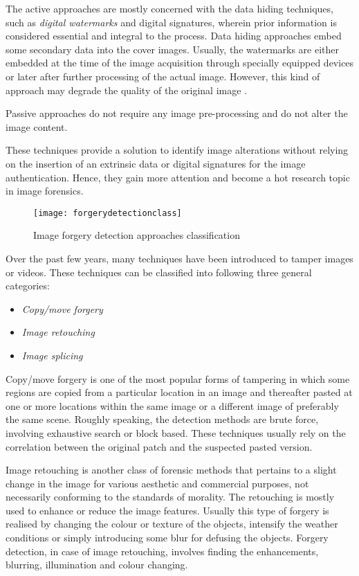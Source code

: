 The active approaches are mostly concerned with the data hiding techniques, such as \emph{digital watermarks} \cite{rey2002survey}\cite{ye2005watermarking} and digital signatures, wherein prior information is considered essential and integral to the process. Data hiding approaches embed some secondary data into the cover images. Usually, the watermarks are either embedded at the time of the image acquisition through specially equipped devices or later after further processing of the actual image.
However, this kind of approach may degrade the quality of the original image \cite{van2007survey}.

Passive approaches \cite{ng2006passive} do not require any image pre-processing and do not alter the image content. 

These techniques provide a solution to identify image alterations without relying on the insertion of an
extrinsic data or digital signatures for the image authentication. Hence, they gain more attention and become a hot research topic in image forensics.


\begin{figure}
  \centering
    \texttt{[image: forgerydetectionclass]}
    \caption{Image forgery detection approaches classification}
\end{figure}

Over the past few years, many techniques have been introduced to tamper images or
videos. These techniques can be classified into following three general categories:

\begin{itemize}
\item \emph{Copy/move forgery}
\item \emph{Image retouching}
\item \emph{Image splicing}
\end{itemize}

Copy/move forgery is one of the most popular forms of tampering in which some regions are copied from a particular location in an image and thereafter pasted at one or more locations within the same image or a different image of preferably the same scene. Roughly speaking, the detection methods are brute force, involving exhaustive search or block based. These techniques usually rely on the correlation between the original patch and the suspected pasted version.

Image retouching is another class of forensic methods that pertains to a slight change in the image for various aesthetic and commercial purposes, not necessarily conforming to the standards of morality. The retouching is mostly used to enhance or reduce the image features. Usually this type of forgery is realised by changing the colour or texture of the objects, intensify the weather conditions or simply
introducing some blur for defusing the objects. Forgery detection, in case of image retouching, involves
finding the enhancements, blurring, illumination and colour changing.

